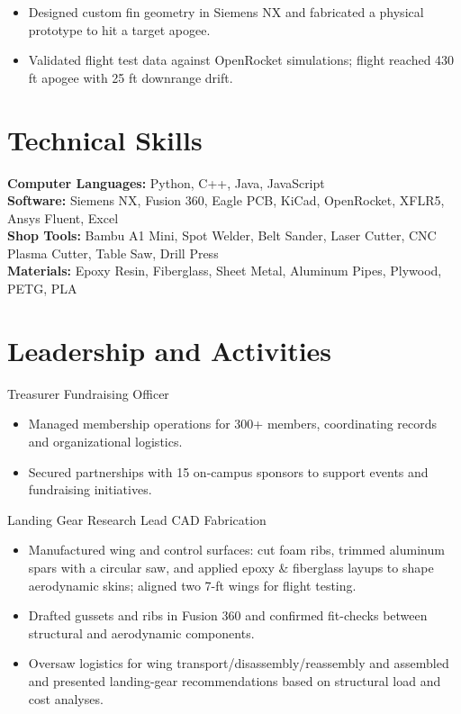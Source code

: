 \begin{itemize}
  \item Designed custom fin geometry in Siemens NX and fabricated a physical prototype to hit a target apogee.
  \item Validated flight test data against OpenRocket simulations; flight reached 430 ft apogee with 25 ft downrange drift.
\end{itemize}

\section{Technical Skills}
\textbf{Computer Languages:} Python, C++, Java, JavaScript\\
\textbf{Software:} Siemens NX, Fusion 360, Eagle PCB, KiCad, OpenRocket, XFLR5, Ansys Fluent, Excel\\
\textbf{Shop Tools:} Bambu A1 Mini, Spot Welder, Belt Sander, Laser Cutter, CNC Plasma Cutter, Table Saw, Drill Press\\
\textbf{Materials:} Epoxy Resin, Fiberglass, Sheet Metal, Aluminum Pipes, Plywood, PETG, PLA

\section{Leadership and Activities}

Treasurer \textbar{} Fundraising Officer
\begin{itemize}
  \item Managed membership operations for 300+ members, coordinating records and organizational logistics.
  \item Secured partnerships with 15 on-campus sponsors to support events and fundraising initiatives.
\end{itemize}
\entrygap

Landing Gear Research Lead \textbar{} CAD \textbar{} Fabrication
\begin{itemize}
  \item Manufactured wing and control surfaces: cut foam ribs, trimmed aluminum spars with a circular saw, and applied epoxy \& fiberglass layups to shape aerodynamic skins; aligned two 7-ft wings for flight testing.
  \item Drafted gussets and ribs in Fusion 360 and confirmed fit-checks between structural and aerodynamic components.
  \item Oversaw logistics for wing transport/disassembly/reassembly and assembled and presented landing-gear recommendations based on structural load and cost analyses.
\end{itemize}


